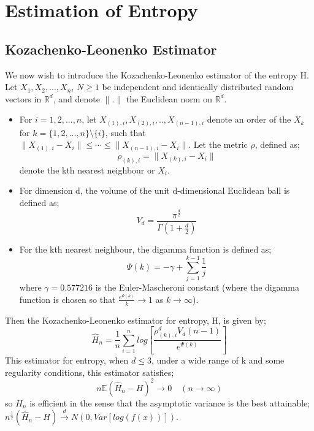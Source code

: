 \documentclass{article}
\begin{document}
\section{Estimation of Entropy}

\subsection{Kozachenko-Leonenko Estimator}

We now wish to introduce the Kozachenko-Leonenko estimator of the entropy H. Let $X_{1}, X_{2}, ... ,X_{n}$, $N \geq 1$ be independent and identically distributed random vectors in $\mathbb{R}^{d}$, and denote $\|.\|$ the Euclidean norm on $\mathbb{R}^{d}$.
 
\begin{itemize}

\item For $i = 1, 2, ..., n$, let $X_{(1), i}, X_{(2), i}, .., X_{(n-1), i}$ denote an order of the $X_{k}$ for $k = \{1, 2, ..., n\} \setminus \{i\}$, such that $\| X_{(1), i} - X_{i}\| \leq \cdots \leq \|  X_{(n-1), i} - X_{i}\| $. Let the metric $\rho$, defined as;
\begin{equation}
\rho_{(k), i} = \| X_{(k), i} - X_{i}\|
\end{equation} denote the kth nearest neighbour or $X_{i}$.

\item  For dimension d, the volume of the unit d-dimensional Euclidean ball is defined as;
\begin{equation}
V_{d} = \frac{\pi^\frac{d}{2}}{\Gamma(1 + \frac{d}{2})}
\end{equation}

\item For the kth nearest neighbour, the digamma function is defined as;
\begin{equation}
\Psi(k) = -\gamma + \sum_{j=1}^{k-1} \frac{1}{j}
\end{equation}
where $\gamma = 0.577216$ is the Euler-Mascheroni constant (where the digamma function is chosen so that $\frac{e^{\Psi(k)}}{k}\to1$ as $k \to \infty$).

\end{itemize} Then the Kozachenko-Leonenko estimator for entropy, H, is given by;
\begin{equation} \label{KLest}
\hat{H}_{n} = \frac{1}{n} \sum_{i=1}^{n} log \left[ \frac{\rho_{(k),i}^{d} V_{d} (n-1)}{e^{\Psi(k)}} \right]
\end{equation} This estimator for entropy, when $d \leq 3$, under a wide range of k and some regularity conditions, this estimator satisfies;
\begin{equation} \label{efficiency}
n \mathbb{E} {(\hat{H}_{n} - H)^2} \to 0 \quad  (n \to \infty)
\end{equation} so $\hat{H}_{n}$ is efficient in the sense that the asymptotic variance is the best attainable; $n^{\frac{1}{2}}(\hat{H}_{n} - H) \xrightarrow{d} N(0, Var[log(f(x))])$.
\end{document}
